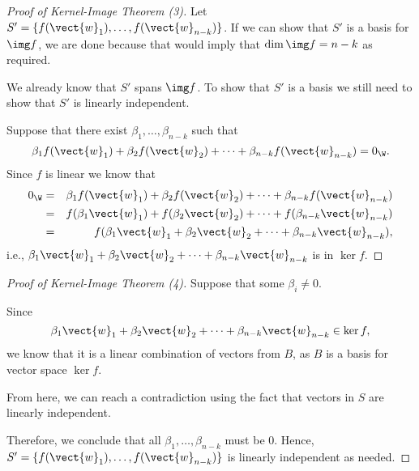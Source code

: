 \begin{frame}
  \begin{proof}[Proof of Kernel-Image Theorem (3)]
    {\small
      \pause
      Let $S'=\{f(\vect{w}_1),\ldots,f(\vect{w}_{n-k})\}$.  If we can show
      that $S'$ is a basis for $\img f$, we are done because that would
      imply that $\dim\img f=n-k$ as required.

      \pause
      We already know that $S'$ spans $\img f$.
      \pause To show that $S'$ is a
      basis we still need to show that $S'$ is linearly independent.

      \pause
      Suppose that there exist $\beta_1,\ldots,\beta_{n-k}$ such that
      \[
      \beta_1f(\vect{w}_1) + \beta_2f(\vect{w}_2) + \cdots +
      \beta_{n-k}f(\vect{w}_{n-k}) = 0_\W.
      \]
      \pause
      Since $f$ is linear we know that
      \begin{eqnarray*}
        0_\W &=&
        \beta_1f(\vect{w}_1) + \beta_2f(\vect{w}_2) + \cdots +
        \beta_{n-k}f(\vect{w}_{n-k})\\
        &=&
        f(\beta_1\vect{w}_1) + f(\beta_2\vect{w}_2) + \cdots +
        f(\beta_{n-k}\vect{w}_{n-k})\\
        &=&
        f(\beta_1\vect{w}_1 + \beta_2\vect{w}_2 + \cdots +
        \beta_{n-k}\vect{w}_{n-k}),
      \end{eqnarray*}
      i.e., $\beta_1\vect{w}_1 + \beta_2\vect{w}_2 + \cdots +
      \beta_{n-k}\vect{w}_{n-k}$ is in $\ker f$.
    }
  \end{proof}
\end{frame}

\begin{frame}
  \begin{proof}[Proof of Kernel-Image Theorem (4)]
    {\small
      Suppose that some $\beta_i\neq 0$.

      Since
      \[
      \beta_1\vect{w}_1 + \beta_2\vect{w}_2 + \cdots +
      \beta_{n-k}\vect{w}_{n-k} \in \ker f,
      \]
      we know that it is a linear combination of vectors from $B$, as
      $B$ is a basis for vector space $\ker f$.

      \pause From here, we can reach a contradiction using the fact
      that vectors in $S$ are linearly independent.

      \pause
      Therefore, we conclude that all $\beta_1,\ldots,\beta_{n-k}$
      must be 0.  Hence,
      $S'=\{f(\vect{w}_1),\ldots,f(\vect{w}_{n-k})\}$ is linearly
      independent as needed.
    }
  \end{proof}
\end{frame}

